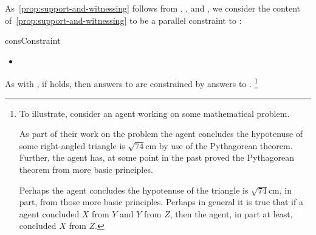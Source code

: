 \begin{note}
  As~\autoref{prop:support-and-witnessing} follows from \linkW{}, \linkH{}, and \issueInclusion{}, we consider the content of~\autoref{prop:support-and-witnessing} to be a parallel constraint to \issueInclusion{}:

  \begin{constraint}{consConstraint}{\issueConstraint{}}
    \medskip
    \begin{itemize}
    \item
    \end{itemize}
    \vspace{-\baselineskip}
  \end{constraint}

  As with \issueInclusion{}, if \issueConstraint{} holds, then answers to \qWhyV{} are constrained by answers to \qHowV{}.%
  \footnote{
    To illustrate, consider an agent working on some mathematical problem.

    As part of their work on the problem the agent concludes the hypotenuse of some right-angled triangle is \(\sqrt{74}\text{cm}\) by use of the Pythagorean theorem.
    Further, the agent has, at some point in the past proved the Pythagorean theorem from more basic principles.

    Perhaps the agent concludes the hypotenuse of the triangle is \(\sqrt{74}\text{cm}\), in part, from those more basic principles.
    Perhaps in general it is true that if a agent concluded \(X\) from \(Y\) and \(Y\) from \(Z\), then the agent, in part at least, concluded \(X\) from \(Z\).

}
\end{note}

